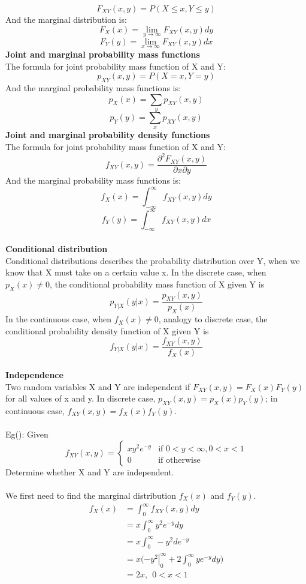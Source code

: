 \documentclass[a4paper,12pt]{article}
\let\cite\parencite
\begin{document}
$$F_{XY}(x,y) = P(X \leq x, Y \leq y)$$
And the marginal distribution is:
$$F_X(x) = \lim \limits_{y \rightarrow \infty}  F_{XY}(x,y) dy$$
$$F_Y(y) = \lim \limits_{x \rightarrow \infty}  F_{XY}(x,y) dx$$
\textbf{Joint and marginal probability mass functions} \\
The formula for joint probability mass function of X and Y:
$$p_{XY}(x,y) = P(X = x, Y = y)$$
And the marginal probability mass functions is:
$$p_X(x) = \sum_{y} p_{XY}(x,y)$$
$$p_Y(y) = \sum_{x} p_{XY}(x,y)$$
\textbf{Joint and marginal probability density functions} \\
The formula for joint probability mass function of X and Y:
$$f_{XY}(x,y) = \frac{\partial^2 F_{XY}(x,y)}{\partial x \partial y}$$
And the marginal probability mass functions is:
$$f_X(x) = \int_{-\infty}^{\infty} f_{XY}(x,y) dy$$
$$f_Y(y) = \int_{-\infty}^{\infty} f_{XY}(x,y) dx$$
\\
\textbf{Conditional distribution} \\
Conditional distributions describes the probability distribution over Y, when we know that X must take on a certain value x. In the discrete case, when $p_X(x) \neq 0$, the conditional probability
mass function of X given Y is 
$$p_{Y|X}(y|x) = \frac{p_{XY}(x,y)}{p_X(x)}$$
In the continuous case, when $f_X(x) \neq 0$, analogy to discrete case, the conditional probability density function of X given Y is 
$$f_{Y|X}(y|x) = \frac{f_{XY}(x,y)}{f_X(x)}$$
\\
\textbf{Independence} \\
Two random variables X and Y are independent if $F_{XY}(x,y) = F_X(x)F_Y(y)$ for all values of x and y. In discrete case, $p_{XY}(x,y) = p_X(x)p_Y(y)$; in continuous case, $f_{XY}(x,y) = f_X(x)f_Y(y)$. \\
\\
Eg(\cite{marg}):
Given 
\[
 f_{XY}(x,y) = 
  \begin{cases} 
   xy^2e^{-y} & \text{if } 0<y<\infty, 0<x<1 \\
   0      & \text{if otherwise}
  \end{cases}
\]
Determine whether X and Y are independent. \\
\\
We first need to find the marginal distribution $f_X(x)$ and $f_Y(y)$.
\begin{equation*}
\begin{split}
f_X(x) & = \int_0^{\infty} f_{XY}(x,y)dy \\ 
& = x\int_0^{\infty}y^2e^{-y}dy \\
& = x\int_0^{\infty} -y^2de^{-y} \\
& = \left. x(-y^2 \right|_0^{\infty} + 2\int_0^{\infty}ye^{-y}dy) \\
& = 2x, \ \ 0<x<1
\end{split}
\end{equation*}
\end{document}
